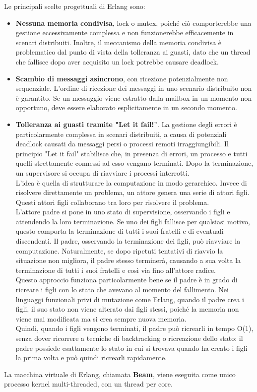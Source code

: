 \documentclass{article}
\begin{document}
Le principali scelte progettuali di Erlang sono:
\begin{itemize}
    \item \textbf{Nessuna memoria condivisa}, lock o mutex, poiché ciò comporterebbe una gestione eccessivamente complessa e non funzionerebbe efficacemente in scenari distribuiti. Inoltre, il meccanismo della memoria condivisa è problematico dal punto di vista della tolleranza ai guasti, dato che un thread che fallisce dopo aver acquisito un lock potrebbe causare deadlock.
    \item \textbf{Scambio di messaggi asincrono}, con ricezione potenzialmente non sequenziale. L'ordine di ricezione dei messaggi in uno scenario distribuito non è garantito. Se un messaggio viene estratto dalla mailbox in un momento non opportuno, deve essere elaborato esplicitamente in un secondo momento.
    \item \textbf{Tolleranza ai guasti tramite "Let it fail!"}. La gestione degli errori è particolarmente complessa in scenari distribuiti, a causa di potenziali deadlock causati da messaggi persi o processi remoti irraggiungibili. Il principio "Let it fail" stabilisce che, in presenza di errori, un processo e tutti quelli strettamente connessi ad esso vengano terminati. Dopo la terminazione, un supervisore si occupa di riavviare i processi interrotti.\\
    L'idea è quella di strutturare la computazione in modo gerarchico. Invece di risolvere direttamente un problema, un attore genera una serie di attori figli. Questi attori figli collaborano tra loro per risolvere il problema.\\
    L'attore padre si pone in uno stato di supervisione, osservando i figli e attendendo la loro terminazione. Se uno dei figli fallisce per qualsiasi motivo, questo comporta la terminazione di tutti i suoi fratelli e di eventuali discendenti. Il padre, osservando la terminazione dei figli, può riavviare la computazione. Naturalmente, se dopo ripetuti tentativi di riavvio la situazione non migliora, il padre stesso terminerà, causando a sua volta la terminazione di tutti i suoi fratelli e così via fino all'attore radice.\\
    Questo approccio funziona particolarmente bene se il padre è in grado di ricreare i figli con lo stato che avevano al momento del fallimento. Nei linguaggi funzionali privi di mutazione come Erlang, quando il padre crea i figli, il suo stato non viene alterato dai figli stessi, poiché la memoria non viene mai modificata ma si crea sempre nuova memoria.\\
    Quindi, quando i figli vengono terminati, il padre può ricrearli in tempo O(1), senza dover ricorrere a tecniche di backtracking o ricreazione dello stato: il padre possiede esattamente lo stato in cui si trovava quando ha creato i figli la prima volta e può quindi ricrearli rapidamente.
\end{itemize}
La macchina virtuale di Erlang, chiamata \textbf{Beam}, viene eseguita come unico processo kernel multi-threaded, con un thread per core.
\end{document}
